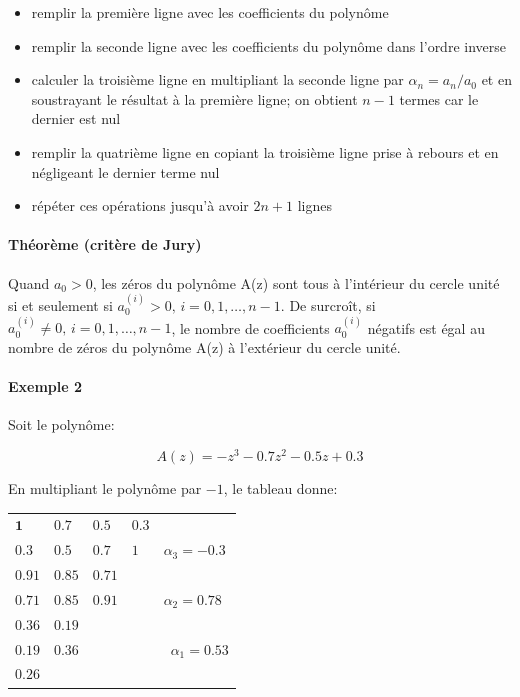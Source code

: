 \documentclass[11pt]{article}
\providecommand{\tightlist}{%
      \setlength{\itemsep}{0pt}\setlength{\parskip}{0pt}}
\begin{document}
\begin{itemize}
\tightlist
\item
  remplir la première ligne avec les coefficients du polynôme
\item
  remplir la seconde ligne avec les coefficients du polynôme dans
  l'ordre inverse
\item
  calculer la troisième ligne en multipliant la seconde ligne par
  \(\alpha_n = a_n/a_0\) et en soustrayant le résultat à la première
  ligne; on obtient \(n-1\) termes car le dernier est nul
\item
  remplir la quatrième ligne en copiant la troisième ligne prise à
  rebours et en négligeant le dernier terme nul
\item
  répéter ces opérations jusqu'à avoir \(2n+1\) lignes
\end{itemize}

    \paragraph{Théorème (critère de
Jury)}\label{thuxe9oruxe8me-crituxe8re-de-jury}

Quand \(a_0 > 0\), les zéros du polynôme A(z) sont tous à l'intérieur du
cercle unité si et seulement si
\(a_0^{(i)} > 0,\, i = 0, 1, \dots, n-1\). De surcroît, si
\(a_0^{(i)} \neq 0,\, i=0, 1, \dots, n-1\), le nombre de coefficients
\(a_0^{(i)}\) négatifs est égal au nombre de zéros du polynôme A(z) à
l'extérieur du cercle unité.

    \paragraph{Exemple 2}\label{exemple-2}

Soit le polynôme:

\[ A(z) = -z^3 - 0.7z^2 - 0.5z + 0.3 \]

    En multipliant le polynôme par \(-1\), le tableau donne:

\begin{longtable}[]{@{}lllll@{}}
\toprule
\( \mathbf{1} \) & \( 0.7 \) & \( 0.5 \) & \( 0.3 \) &\tabularnewline
\( 0.3 \) & \( 0.5 \) & \( 0.7 \) & \( 1 \) &
\( \alpha_3 = -0.3 \)\tabularnewline
\( \mathbf{0.91} \) & \( 0.85 \) & \( 0.71 \) &\tabularnewline
\( 0.71 \) & \( 0.85 \) & \( 0.91 \) & &
\( \alpha_2 = 0.78 \)\tabularnewline
\( \mathbf{0.36} \) & \( 0.19 \) &\tabularnewline
\( 0.19 \) & \( 0.36 \) & & ~ & ~\( \alpha_1 = 0.53 \)\tabularnewline
\( \mathbf{0.26} \) &\tabularnewline
\bottomrule
\end{longtable}
\end{document}
